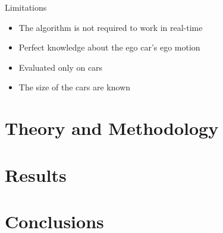 \documentclass{beamer}
\begin{document}
\begin{frame}{Limitations}
	\begin{itemize}
		\item The algorithm is not required to work in real-time
		\item Perfect knowledge about the ego car's ego motion
		\item Evaluated only on cars
		\item The size of the cars are known
	\end{itemize}
\end{frame}

\section{Theory and Methodology}

\section{Results}

\section{Conclusions}
\end{document}
